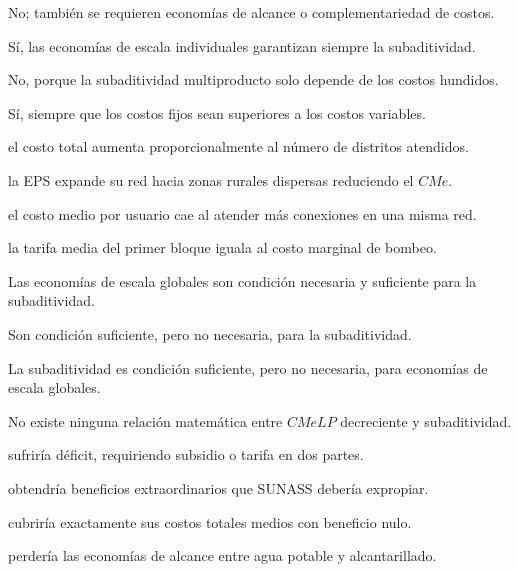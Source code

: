 \begin{opts}
    \item No; también se requieren economías de alcance o complementariedad de costos.
    \item Sí, las economías de escala individuales garantizan siempre la subaditividad.
    \item No, porque la subaditividad multiproducto solo depende de los costos hundidos.
    \item Sí, siempre que los costos fijos sean superiores a los costos variables.
\end{opts}

\begin{opts}
    \item el costo total aumenta proporcionalmente al número de distritos atendidos.
    \item la EPS expande su red hacia zonas rurales dispersas reduciendo el $CMe$.
    \item el costo medio por usuario cae al atender más conexiones en una misma red.
    \item la tarifa media del primer bloque iguala al costo marginal de bombeo.
\end{opts}

\begin{opts}
    \item Las economías de escala globales son condición necesaria y suficiente para la subaditividad.
    \item Son condición suficiente, pero no necesaria, para la subaditividad.
    \item La subaditividad es condición suficiente, pero no necesaria, para economías de escala globales.
    \item No existe ninguna relación matemática entre $CMeLP$ decreciente y subaditividad.
\end{opts}

\begin{opts}
    \item sufriría déficit, requiriendo subsidio o tarifa en dos partes.
    \item obtendría beneficios extraordinarios que SUNASS debería expropiar.
    \item cubriría exactamente sus costos totales medios con beneficio nulo.
    \item perdería las economías de alcance entre agua potable y alcantarillado.
\end{opts}

